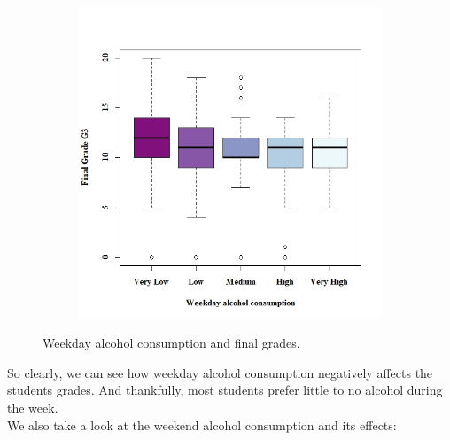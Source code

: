\documentclass[a4paper, 11pt]{article}
\begin{document}
\begin{figure}[H]
\begin{subfigure}[b]{0.3\linewidth}
			\includegraphics[width=1.6\linewidth]{weekday_alcohol_grades.jpeg}
		\end{subfigure}
		\caption*{Weekday alcohol consumption and final grades.}
		\label{fig:weekday_alcohol_grades}
	\end{figure}

	So clearly, we can see how weekday alcohol consumption negatively affects the students grades. And thankfully, most students prefer little to no alcohol during the week.
	\\
	
	We also take a look at the weekend alcohol consumption and its effects:
	
\end{document}
